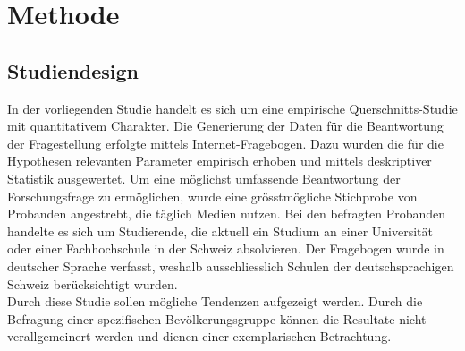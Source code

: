 %
%
\glsresetall
\let\raggedsection\centering 
\chapter{Methode}
\let\raggedsection\raggedright 

\section{Studiendesign}\label{section.studiendesign}
In der vorliegenden Studie handelt es sich um eine empirische Querschnitts-Studie mit quantitativem Charakter. Die Generierung der Daten für die Beantwortung der Fragestellung erfolgte mittels Internet-Fragebogen. Dazu wurden die für die Hypothesen relevanten Parameter empirisch erhoben und mittels deskriptiver Statistik ausgewertet. Um eine möglichst umfassende Beantwortung der Forschungsfrage zu ermöglichen, wurde eine grösstmögliche Stichprobe von Probanden angestrebt, die täglich Medien nutzen. Bei den befragten Probanden handelte es sich um Studierende, die aktuell ein Studium an einer Universität oder einer Fachhochschule in der Schweiz absolvieren. Der Fragebogen wurde in deutscher Sprache verfasst, weshalb ausschliesslich Schulen der deutschsprachigen Schweiz berücksichtigt wurden.\\
Durch diese Studie sollen mögliche Tendenzen aufgezeigt werden. Durch die Befragung einer spezifischen Bevölkerungsgruppe können die Resultate nicht verallgemeinert werden und dienen einer exemplarischen Betrachtung.

